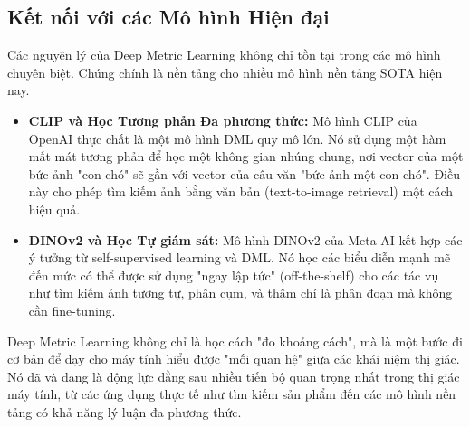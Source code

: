 \subsection{Kết nối với các Mô hình Hiện đại}
\label{subsec:dml_modern_connections}
Các nguyên lý của Deep Metric Learning không chỉ tồn tại trong các mô hình chuyên biệt. Chúng chính là nền tảng cho nhiều mô hình nền tảng SOTA hiện nay.
\begin{itemize}
	\item \textbf{CLIP và Học Tương phản Đa phương thức:} Mô hình CLIP của OpenAI \cite{Radford2021} thực chất là một mô hình DML quy mô lớn. Nó sử dụng một hàm mất mát tương phản để học một không gian nhúng chung, nơi vector của một bức ảnh "con chó" sẽ gần với vector của câu văn "bức ảnh một con chó". Điều này cho phép tìm kiếm ảnh bằng văn bản (text-to-image retrieval) một cách hiệu quả.
	\item \textbf{DINOv2 và Học Tự giám sát:} Mô hình DINOv2 của Meta AI \cite{Oquab2023} kết hợp các ý tưởng từ self-supervised learning và DML. Nó học các biểu diễn mạnh mẽ đến mức có thể được sử dụng "ngay lập tức" (off-the-shelf) cho các tác vụ như tìm kiếm ảnh tương tự, phân cụm, và thậm chí là phân đoạn mà không cần fine-tuning.
\end{itemize}
Deep Metric Learning không chỉ là học cách "đo khoảng cách", mà là một bước đi cơ bản để dạy cho máy tính hiểu được "mối quan hệ" giữa các khái niệm thị giác. Nó đã và đang là động lực đằng sau nhiều tiến bộ quan trọng nhất trong thị giác máy tính, từ các ứng dụng thực tế như tìm kiếm sản phẩm đến các mô hình nền tảng có khả năng lý luận đa phương thức.

